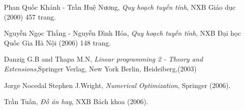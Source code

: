 \begin{thebibliography}{50}
\bibitem{[Kha]} Phan Quốc Khánh  - Trần Huệ Nương, {\it Quy hoạch tuyến tính}, NXB Giáo dục (2000) 457 trang.

\bibitem{[Tha]} Nguyễn Ngọc Thắng - Nguyễn Đình Hóa, {\it Quy hoạch tuyến tính}, NXB Đại học Quốc Gia Hà Nội (2006) 148 trang.

\bibitem{[Dan]}Danzig G.B and Thapa M.N, {\it Linear programming 2 - Theory and Extensions},Springer Verlag, New York Berlin, Heideiberg,(2003)

\bibitem{[Jor]}Jorge Nocedal Stephen J.Wright, {\it Numerical Optimization}, Springer (2006).

\bibitem{[Jor]}Trần Tuấn, {\it Đồ án hay}, NXB Bách khoa (2006).
\end{thebibliography} 
